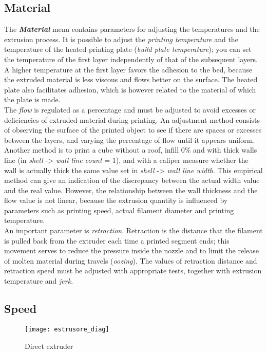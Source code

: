 \subsection{Material}
The \emph{\textbf{Material}} menu contains parameters for adjusting the temperatures and the extrusion process.
It is possible to adjust the \emph{printing temperature} and the temperature of the heated printing plate (\emph{build plate temperature}); you can set the temperature of the first layer independently of that of the subsequent layers. A higher temperature at the first layer favors the adhesion to the bed, because the extruded material is less viscous and flows better on the surface. The heated plate also facilitates adhesion, which is however related to the material of which the plate is made.\\
The \emph{flow} is regulated as a percentage and must be adjusted to avoid excesses or deficiencies of extruded material during printing. An adjustment method consists of observing the surface of the printed object to see if there are spaces or excesses between the layers, and varying the percentage of flow until it appears uniform. Another method is to print a cube without a roof, infill 0\% and with thick walls line (in \emph{shell} -> \emph{wall line count} = 1), and with a caliper measure whether the wall is actually thick the same value set in \emph{shell} -> \emph{wall line width}.
This empirical method can give an indication of the discrepancy between the actual width value and the real value. However, the relationship between the wall thickness and the flow value is not linear, because the extrusion quantity is influenced by parameters such as printing speed, actual filament diameter and printing temperature.\\
An important parameter is \emph{retraction}. Retraction is the distance that the filament is pulled back from the extruder each time a printed segment ends; this movement serves to reduce the pressure inside the nozzle and to limit the release of molten material during travels (\emph{oozing}). The values of retraction distance and retraction speed must be adjusted with appropriate tests, together with extrusion temperature and \emph{jerk}.

\subsection{Speed}
\begin{wrapfigure}{R}{0.4\textwidth}
\vspace{-20pt}
\texttt{[image: estrusore\_diag]}
    \caption{Direct extruder}
    \label{fig: estrusore_diag}
\end{wrapfigure}

